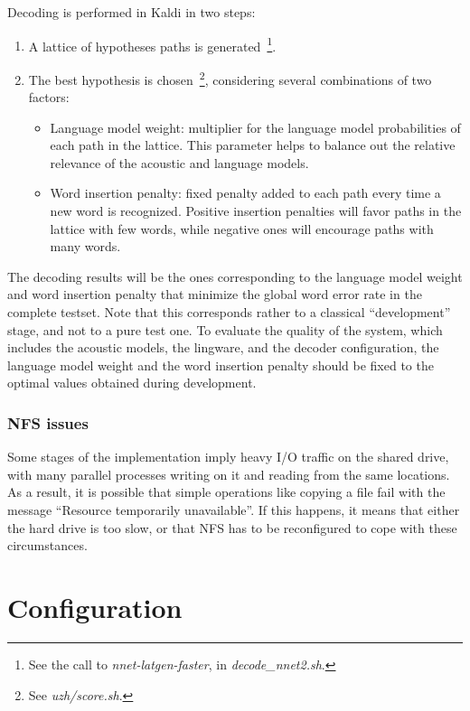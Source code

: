 \documentclass[11pt,a4paper,titlepage,twoside]{article}
\begin{document}
Decoding is performed in Kaldi in two steps:

\begin{enumerate}
\item A lattice of hypotheses paths is generated~\footnote{See the call to \textit{nnet-latgen-faster}, in \textit{decode\_nnet2.sh}.}.
\item The best hypothesis is chosen~\footnote{See \textit{uzh/score.sh}.}, considering several combinations of two factors:
  \begin{itemize}
  \item Language model weight: multiplier for the language model probabilities of each path in the lattice. This parameter helps to balance out the relative relevance of the acoustic and language models.
  \item Word insertion penalty: fixed penalty added to each path every time a new word is recognized. Positive insertion penalties will favor paths in the lattice with few words, while negative ones will encourage paths with many words.
  \end{itemize}
\end{enumerate} 

The decoding results will be the ones corresponding to the language model weight and word insertion penalty that minimize the global word error rate in the complete testset. Note that this corresponds rather to a classical ``development'' stage, and not to a pure test one. To evaluate the quality of the system, which includes the acoustic models, the lingware, and the decoder configuration, the language model weight and the word insertion penalty should be fixed to the optimal values obtained during development.

\subsubsection{NFS issues}
\label{sec:nfs-issues}

Some stages of the implementation imply heavy I/O traffic on the shared drive, with many parallel processes writing on it and reading from the same locations. As a result, it is possible that simple operations like copying a file fail with the message ``Resource temporarily unavailable''. If this happens, it means that either the hard drive is too slow, or that NFS has to be reconfigured to cope with these circumstances.

\section{Configuration}
\label{sec:configuration}
\end{document}
